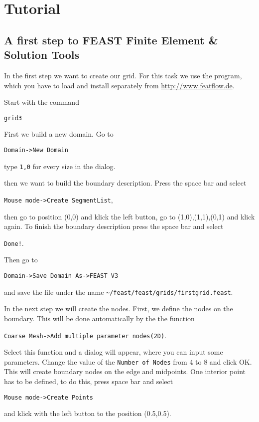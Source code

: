 \chapter{Tutorial}

\section{A first step to FEAST Finite Element \& Solution Tools}

In the first step we want to create our grid. For this task we use
the \devisor program, which you have to load and install separately
from \url{http://www.featflow.de}.

Start \devisor with the command

\begin{verbatim}
grid3
\end{verbatim}

First we build a new domain. Go to

\verb+Domain->New Domain+ 

type \verb+1,0+ for every size in the dialog.


then we want to build the boundary description. Press the
space bar and select 

\verb+Mouse mode->Create SegmentList+, 

then
go to position (0,0) and klick the
left button, go to (1,0),(1,1),(0,1) and
klick again. To finish the boundary description press the
space bar and select 

\verb+Done!+. 

Then go to 

\verb+Domain->Save Domain As->FEAST V3+

and save the 
file under
the name \verb+~/feast/feast/grids/firstgrid.feast+.

In the next step we will create the nodes. First, we define the nodes
on the boundary. This will be done automatically by the the function

\verb+Coarse Mesh->Add multiple parameter nodes(2D)+. 

Select this function and a dialog will appear, where you can input some parameters. Change the value
of the \verb+Number of Nodes+ from 4 to 8 and click OK. This will create boundary nodes
on the edge and midpoints. One interior point has to be defined, to do this, press
space bar and select 

\verb+Mouse mode->Create Points+

and klick with the left button to
the position (0.5,0.5).

